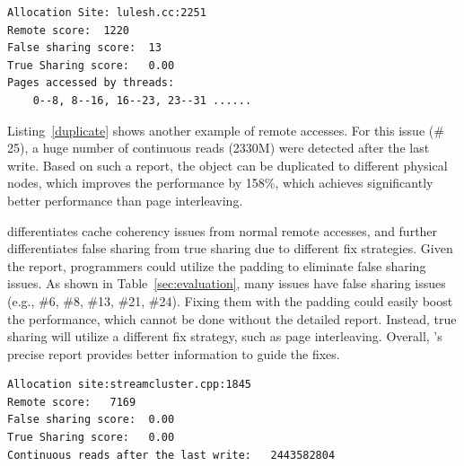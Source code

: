 \begin{lstlisting}[caption={Remote access issue of lulesh },label={blockinterleave},captionpos=b]
Allocation Site: lulesh.cc:2251
Remote score:  1220
False sharing score:  13
True Sharing score:   0.00
Pages accessed by threads:
    0--8, 8--16, 16--23, 23--31 ......
\end{lstlisting}

Listing~\ref{duplicate} shows another example of remote accesses. For this issue (\# 25), a huge number of continuous reads (2330M) were detected after the last write. Based on such a report, the object can be duplicated to different physical nodes, which improves the performance by 158\%, which achieves significantly better performance than page interleaving.

\NP{} differentiates cache coherency issues from normal remote accesses, and further differentiates false sharing from true sharing due to different fix strategies. Given the report, programmers could utilize the padding to eliminate false sharing issues. As shown in Table~\ref{sec:evaluation}, many issues have false sharing issues (e.g., \#6, \#8, \#13, \#21, \#24). Fixing them with the padding could easily boost the performance, which cannot be done without the detailed report. Instead, true sharing will utilize a different fix strategy, such as page interleaving. Overall, \NP{}'s precise report provides better information to guide the fixes.  
\begin{lstlisting}[caption={Remote access issue of streamcluster},label={duplicate},captionpos=b]
Allocation site:streamcluster.cpp:1845
Remote score:   7169
False sharing score:  0.00
True Sharing score:   0.00
Continuous reads after the last write:   2443582804
\end{lstlisting}


